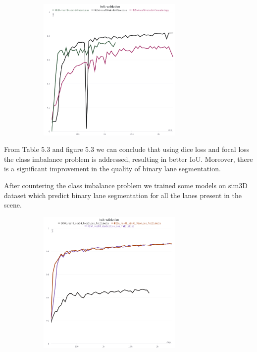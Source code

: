     \begin{figure}[h]
       \caption{IoU for ego-vehicle binary lane segmentation trained on sim3D dataset\cite{guo2020gen} with cross entropy, dice and focal loss.}
        \centering
        \begin{subfigure}{0.6\textwidth}
        \includegraphics[width=1\linewidth, height=7cm]{images/change2.png} 
        \label{fig:subim1}
        \end{subfigure}
        \end{figure}
    
    From Table 5.3 and figure 5.3 we can conclude that using dice loss and focal loss the class imbalance problem is addressed, resulting in better IoU. Moreover, there is a significant improvement in the quality of binary lane segmentation.
    
        After countering the class imbalance problem we trained some models on sim3D dataset which predict binary lane segmentation for all the lanes present in the scene.
        
        \begin{figure}[h]
       \caption{IoU for binary lane segmentation trained on sim3D dataset \cite{guo2020gen} with cross entropy, dice and focal loss.}
        \centering
        \begin{subfigure}{0.6\textwidth}
        \includegraphics[width=1\linewidth, height=7cm]{images/change1.png} 
        \label{fig:subim1}
        \end{subfigure}
        \end{figure}
           

